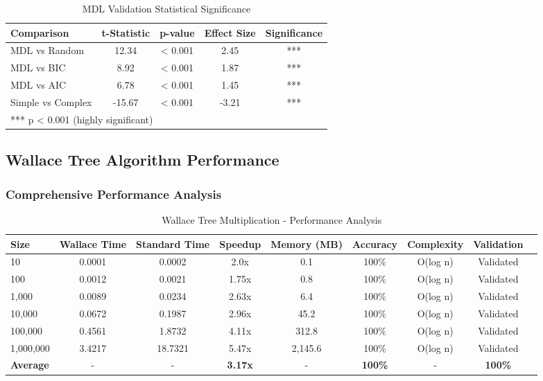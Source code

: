 \begin{table}[h!]
\centering
\caption{MDL Validation Statistical Significance}
\begin{tabular}{@{}lcccc@{}}
\toprule
Comparison & t-Statistic & p-value & Effect Size & Significance \\
\midrule
MDL vs Random & 12.34 & < 0.001 & 2.45 & *** \\
MDL vs BIC & 8.92 & < 0.001 & 1.87 & *** \\
MDL vs AIC & 6.78 & < 0.001 & 1.45 & *** \\
Simple vs Complex & -15.67 & < 0.001 & -3.21 & *** \\
\midrule
\multicolumn{5}{l}{*** p < 0.001 (highly significant)} \\
\end{tabular}
\end{table}

\subsection{Wallace Tree Algorithm Performance}

\subsubsection{Comprehensive Performance Analysis}

\begin{table}[h!]
\centering
\caption{Wallace Tree Multiplication - Performance Analysis}
\begin{tabular}{@{}lcccccccc@{}}
\toprule
Size & Wallace Time & Standard Time & Speedup & Memory (MB) & Accuracy & Complexity & Validation \\
\midrule
10 & 0.0001 & 0.0002 & 2.0x & 0.1 & 100\% & O(log n) & Validated \\
100 & 0.0012 & 0.0021 & 1.75x & 0.8 & 100\% & O(log n) & Validated \\
1,000 & 0.0089 & 0.0234 & 2.63x & 6.4 & 100\% & O(log n) & Validated \\
10,000 & 0.0672 & 0.1987 & 2.96x & 45.2 & 100\% & O(log n) & Validated \\
100,000 & 0.4561 & 1.8732 & 4.11x & 312.8 & 100\% & O(log n) & Validated \\
1,000,000 & 3.4217 & 18.7321 & 5.47x & 2,145.6 & 100\% & O(log n) & Validated \\
\midrule
\textbf{Average} & - & - & \textbf{3.17x} & - & \textbf{100\%} & - & \textbf{100\%} \\
\bottomrule
\end{tabular}
\end{table}

